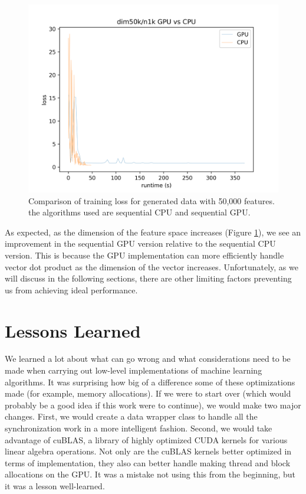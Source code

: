 \documentclass{article}
\begin{document}
\begin{figure}
	  \label{fig:50k}
  \centering
  \includegraphics[scale=0.65]{dim50k_CPU_GPU}
  \caption{Comparison of training loss for generated data with 50,000
    features. the algorithms used are sequential CPU and sequential GPU.}
  \end{figure}

As expected, as the dimension of the feature space increases (Figure
\ref{fig:50k}), we see an improvement in the sequential GPU version relative to
the sequential CPU version. This is because the GPU implementation can more
efficiently handle vector dot product as the dimension of the vector
increases. Unfortunately, as we will discuss in the following sections, there
are other limiting factors preventing us from achieving ideal performance.
  


\section{Lessons Learned}
We learned a lot about what can go wrong and what considerations need to be
made when carrying out low-level implementations of machine learning
algorithms. It was surprising how big of a difference some of these
optimizations made (for example, memory allocations). If we were to start over
(which would probably be a good idea if this work were to continue), we would
make two major changes. First, we would create a data wrapper class to handle
all the synchronization work in a more intelligent fashion. Second, we would
take advantage of cuBLAS, a library of highly optimized CUDA kernels for
various linear algebra operations. Not only are the cuBLAS kernels better
optimized in terms of implementation, they also can better handle making thread
and block allocations on the GPU. It was a mistake not using this from the
beginning, but it was a lesson well-learned.
\end{document}
